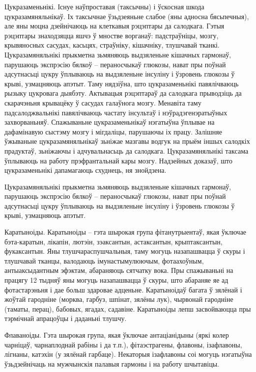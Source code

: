 Цукразаменьнікі.
Існуе наўпроставая (таксычны) і ўскосная шкода цукразамяняльнікаў. Іх таксычнае ўзьдзеяньне слабое (яны адносна бясьпечныя), але яны моцна дзейнічаюць на клеткавыя рэцэптары да салодкага. Гэтыя рэцэптары знаходзяцца яшчэ ў мностве ворганаў: падстраўніцы, мозгу, крывяносных сасудах, касьцях, страўніку, кішачніку, тлушчавай тканкі. Цукразамяняльнікі прыкметна зьмяняюць выдзяленьне кішачных гармонаў, парушаюць экспрэсію бялкоў – пераносчыкаў глюкозы, нават пры поўнай адсутнасьці цукру ўплываюць на выдзяленьне інсуліну і ўзровень глюкозы ў крыві, узмацняюць апэтыт. Таму нядзіўна, што цукразаменьнікі павялічваюць рызыку цукровага дыябэту. Актывацыя рэцэптараў да салодкага прыводзіць да скарачэньня крывацёку ў сасудах галаўнога мозгу. Менавіта таму падсалоджвальнікі павялічваюць частату інсультаў і нэўрадэгенэратыўных захворваньняў. Спажываньне цукразаменьнікаў нэгатыўна ўплывае на дафамінавую сыстэму мозгу і мігдаліцы, парушаючы іх працу. Залішняе ўжываньне цукразамяняльнікаў зьніжае мазгавы водгук на прыём іншых салодкіх прадуктаў, зьніжаючы і адчувальнасьць да салодкага. Цукразамяняльнікі таксама ўплываюць на работу прэфрантальнай кары мозгу. Надзейных доказаў, што цукразаменьнікі дапамагаюць схуднець, ня знойдзена.

Цукразамяняльнікі прыкметна зьмяняюць выдзяленьне кішачных гармонаў, парушаюць экспрэсію бялкоў – пераносчыкаў глюкозы, нават пры поўнай адсутнасьці цукру ўплываюць на выдзяленьне інсуліну і ўзровень глюкозы ў крыві, узмацняюць апэтыт.

Каратыноіды.
Каратыноіды – гэта шырокая група фітанутрыентаў, якая ўключае бэта-каратын, лікапін, лютэін, зэаксантын, астаксантын, крыптаксантын, фукаксантын. Яны тлушчараспушчальныя, таму могуць назапашвацца ў скуры і тлушчавай тканцы, валодаюць імунастымулюючым, фотаахоўным, антыаксыдантным эфэктам, абараняюць сятчатку вока. Пры спажываньні на працягу 12 тыдняў яны могуць назапашвацца ў скуры, што абараняе яе ад фотастарэньня і дае больш здаровае адценьне. Каратыноідаў багата ў зялёнай і жоўтай гародніне (морква, гарбуз, шпінат, зялёны лук), чырвонай гародніне (таматы, перац), бабовых, ягадах, садавіне. Каратыноіды лепш засвойваюцца пры тэрмічнай апрацоўцы і даданьні тлушчу.

Флаваноіды.
Гэта шырокая група, якая ўключае антаціанідыны (яркі колер чарніцаў, чарнаплоднай рабіны і да т.п.), фітаэстрагены, флавоны, ізафлавоны, лігнаны, катэхін (у зялёнай гарбаце). Некаторыя ізафлавоны соі могуць нэгатыўна ўзьдзейнічаць на мужчынскія палавыя гармоны і на работу шчытавіцы.


